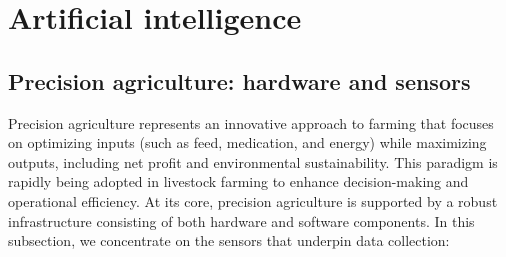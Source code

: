 


\clearpage 


\section{Artificial intelligence}

\subsection{Precision agriculture: hardware and sensors}

Precision agriculture represents an innovative approach to farming that focuses on optimizing inputs (such as feed, medication, and energy) while maximizing outputs, including net profit and environmental sustainability. This paradigm is rapidly being adopted in livestock farming to enhance decision-making and operational efficiency. At its core, precision agriculture is supported by a robust infrastructure consisting of both hardware and software components. In this subsection, we concentrate on the sensors that underpin data collection:


